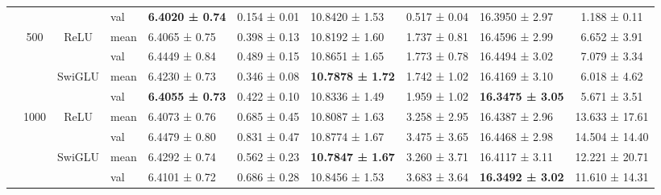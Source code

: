 \begin{table}[htbp]
{\begin{tabular}{c|c|c|p{4.19em}|p{7.125em}|c|p{7.125em}|c|p{7.565em}|c}
              &       &       & val   & \textbf{6.4020 ± 0.74} & 0.154 ± 0.01 & 10.8420 ± 1.53 & 0.517 ± 0.04 & 16.3950 ± 2.97 & 1.188 ± 0.11 \\
        \cmidrule{2-10}      & \multirow{4}[4]{*}{500} & \multicolumn{1}{c|}{\multirow{2}[2]{*}{ReLU}} & mean  & 6.4065 ± 0.75 & 0.398 ± 0.13 & 10.8192 ± 1.60 & 1.737 ± 0.81 & 16.4596 ± 2.99 & 6.652 ± 3.91 \\
              &       &       & val   & 6.4449 ± 0.84 & 0.489 ± 0.15 & 10.8651 ± 1.65 & 1.773 ± 0.78 & 16.4494 ± 3.02 & 7.079 ± 3.34 \\
        \cmidrule{3-10}      &       & \multicolumn{1}{c|}{\multirow{2}[2]{*}{SwiGLU}} & mean  & 6.4230 ± 0.73 & 0.346 ± 0.08 & \textbf{10.7878 ± 1.72} & 1.742 ± 1.02 & 16.4169 ± 3.10 & 6.018 ± 4.62 \\
              &       &       & val   & \textbf{6.4055 ± 0.73} & 0.422 ± 0.10 & 10.8336 ± 1.49 & 1.959 ± 1.02 & \textbf{16.3475 ± 3.05} & 5.671 ± 3.51 \\
        \cmidrule{2-10}      & \multirow{4}[4]{*}{1000} & \multicolumn{1}{c|}{\multirow{2}[2]{*}{ReLU}} & mean  & 6.4073 ± 0.76 & 0.685 ± 0.45 & 10.8087 ± 1.63 & 3.258 ± 2.95 & 16.4387 ± 2.96 & 13.633 ± 17.61 \\
              &       &       & val   & 6.4479 ± 0.80 & 0.831 ± 0.47 & 10.8774 ± 1.67 & 3.475 ± 3.65 & 16.4468 ± 2.98 & 14.504 ± 14.40 \\
        \cmidrule{3-10}      &       & \multicolumn{1}{c|}{\multirow{2}[2]{*}{SwiGLU}} & mean  & 6.4292 ± 0.74 & 0.562 ± 0.23 & \textbf{10.7847 ± 1.67} & 3.260 ± 3.71 & 16.4117 ± 3.11 & 12.221 ± 20.71 \\
              &       &       & val   & 6.4101 ± 0.72 & 0.686 ± 0.28 & 10.8456 ± 1.53 & 3.683 ± 3.64 & \textbf{16.3492 ± 3.02} & 11.610 ± 14.31 \\
        \bottomrule
        \end{tabular}%
        
                
    }
  \label{tab:CVRP result}%
\end{table}%



